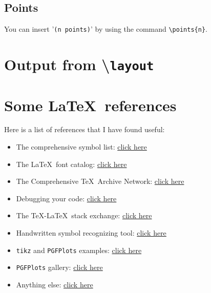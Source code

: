 \documentclass[letterpaper,12pt]{article}
\begin{document}
    \subsection{Points}
        You can insert '\texttt{(n points)}' by using the command 
        \verb|\points{n}|.
	
\newpage
\appendix

\section{Output from \textbackslash\texttt{layout}} \label{layout}
\layout

\section{Some \LaTeX\ references}
Here is a list of references that I have found useful:

\begin{itemize}
\item The comprehensive symbol list: \href{http://mirror.utexas.edu/ctan/info/symbols/comprehensive/symbols-a4.pdf}{click here}

\item The \LaTeX\ font catalog: \href{http://www.tug.dk/FontCatalogue/}{click here}

\item The Comprehensive \TeX\ Archive Network: 
\href{https://www.ctan.org/}{click here}

\item Debugging your code:
\href{http://www.eng.fsu.edu/~dommelen/l2h/errors.html}{click here}

\item The \TeX -\LaTeX\ stack exchange: \href{http://tex.stackexchange.com/}{click here}

\item Handwritten symbol recognizing tool: \href{http://detexify.kirelabs.org/classify.html}{click here}

\item \texttt{tikz} and \texttt{PGFPlots} examples: \href{http://www.texample.net/tikz/examples/}{click here}

\item \texttt{PGFPlots} gallery: 
\href{http://pgfplots.sourceforge.net/gallery.html}{click here}

\item Anything else:
\href{http://texcatalogue.ctan.org/bytopic.html}{click here}


\end{itemize}
\end{document}
